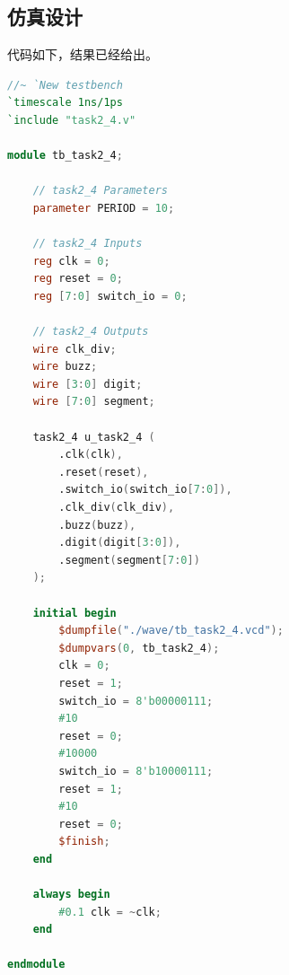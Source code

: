 \documentclass[UTF8]{ctexart}
\begin{document}
\subsection{仿真设计}
代码如下，结果已经给出。
\begin{framed}
    \begin{lstlisting}[language=verilog,style=verilogStyle]
//~ `New testbench
`timescale 1ns/1ps
`include "task2_4.v"

module tb_task2_4;

    // task2_4 Parameters
    parameter PERIOD = 10;

    // task2_4 Inputs
    reg clk = 0;
    reg reset = 0;
    reg [7:0] switch_io = 0;

    // task2_4 Outputs
    wire clk_div;
    wire buzz;
    wire [3:0] digit;
    wire [7:0] segment;

    task2_4 u_task2_4 (
        .clk(clk),
        .reset(reset),
        .switch_io(switch_io[7:0]),
        .clk_div(clk_div),
        .buzz(buzz),
        .digit(digit[3:0]),
        .segment(segment[7:0])
    );

    initial begin
        $dumpfile("./wave/tb_task2_4.vcd");
        $dumpvars(0, tb_task2_4);
        clk = 0;
        reset = 1;
        switch_io = 8'b00000111;
        #10
        reset = 0;
        #10000
        switch_io = 8'b10000111;
        reset = 1;
        #10
        reset = 0;
        $finish;
    end

    always begin
        #0.1 clk = ~clk;
    end

endmodule
    \end{lstlisting}
\end{framed}
\end{document}
